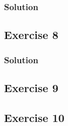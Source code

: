 \documentclass[12pt]{article}
\begin{document}
\subsubsection*{Solution}


\subsection*{Exercise 8}
\subsubsection*{Solution}

\subsection*{Exercise 9}

\subsection*{Exercise 10}
\end{document}
